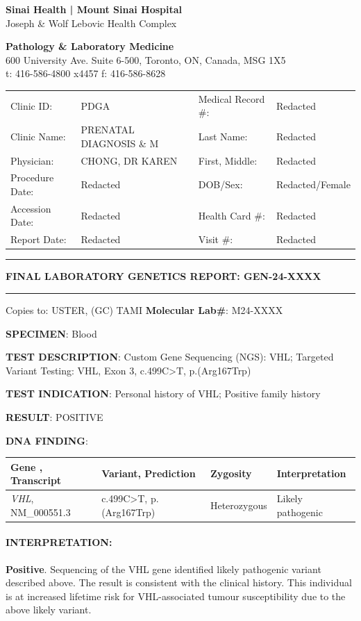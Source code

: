 \documentclass[10pt]{extarticle}
\begin{document}
\parbox[t][][]{.38\textwidth}{
{\large \bf Sinai Health | Mount Sinai Hospital}\\
Joseph \& Wolf Lebovic Health Complex
}
\hfill
\parbox[t][][]{.55\textwidth}{
{\large \bf Pathology \& Laboratory Medicine }\\
{\scriptsize 600 University Ave. Suite 6-500, Toronto, ON, Canada, MSG 1X5 \\
t: 416-586-4800 x4457 f: 416-586-8628}
}

\begin{tabular}{l l l l}
Clinic ID: & PDGA & Medical Record \#:& Redacted \\
Clinic Name: & PRENATAL DIAGNOSIS \& M & Last Name:& Redacted \\
Physician: & CHONG, DR KAREN & First, Middle:& Redacted\\
Procedure Date: & Redacted& DOB/Sex: & Redacted/Female \\
Accession Date: & Redacted & Health Card \#:&  Redacted \\
Report Date: & Redacted & Visit \#:&  Redacted \\
\end{tabular}

\vspace{1em}
\rule{\textwidth}{1pt}

{\Large \bf FINAL LABORATORY GENETICS REPORT: \hfill GEN-24-XXXX}
\rule{\textwidth}{1pt}


Copies to: USTER, (GC) TAMI \hfill {\bf Molecular Lab\#}: M24-XXXX

{\bf SPECIMEN}: Blood

{\bf TEST DESCRIPTION}: Custom Gene Sequencing (NGS): VHL; Targeted Variant Testing: VHL, Exon 3, c.499C>T, p.(Arg167Trp)

{\bf TEST INDICATION}: Personal history of VHL; Positive family history

{\bf RESULT}: POSITIVE

{\bf DNA FINDING}:\\ 
\begin{tabular}{ | l | l | l | l | }
\hline
{\bf Gene , Transcript} & {\bf Variant, Prediction} & {\bf Zygosity} & {\bf Interpretation} \\ \hline
{\it VHL}, NM\_000551.3 & c.499C>T, p.(Arg167Trp) & Heterozygous & Likely pathogenic \\ \hline
\end{tabular}

\paragraph{INTERPRETATION:} {\bf Positive}. Sequencing of the VHL gene identified likely pathogenic variant described above.
The result is consistent with the clinical history. This individual is at increased lifetime risk for VHL-associated tumour susceptibility due to the above likely variant.
\end{document}
